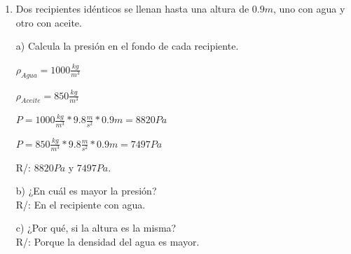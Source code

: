 \documentclass[a4paper, 11pt]{article}
\newcommand{\Pspace}{0.5cm}
\newcommand{\Aspace}{0.2cm}
\begin{document}
\begin{enumerate}
            \vspace{\Aspace} \par
            b) ¿Depende la presión del área del fondo?
            \\ { \color{azul} R/: No, la presión no depende del área, depende de la altura para este caso. }



        \vspace{\Pspace}
        \item Dos recipientes idénticos se llenan hasta una altura de $0.9m$, uno con agua y otro con aceite. \par
            \vspace{\Aspace} \par
            a) Calcula la presión en el fondo de cada recipiente.
            \\ { \color{azul} 
                $\rho_{Agua} = 1000\frac{kg}{m^3}$
                \par $\rho_{Aceite} = 850\frac{kg}{m^{3}}$
                \par $P = 1000\frac{kg}{m^{3}} * 9.8\frac{m}{s^{2}} * 0.9m = 8820 Pa$
                \par $P = 850\frac{kg}{m^3} * 9.8\frac{m}{s^2} * 0.9m = 7497 Pa$
                \par R/: $8820 Pa$ y $7497 Pa$.
            }

            \vspace{\Aspace} \par
            b) ¿En cuál es mayor la presión?
            \\ { \color{azul} R/: En el recipiente con agua. }

            \vspace{\Aspace} \par
            c) ¿Por qué, si la altura es la misma?
            \\ { \color{azul} R/: Porque la densidad del agua es mayor. }
    \end{enumerate}
\end{document}
